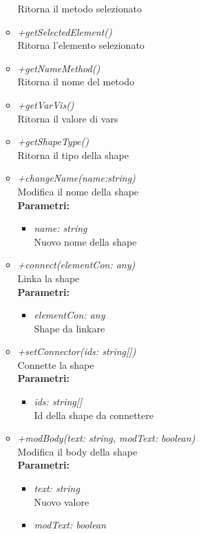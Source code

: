 \begin{itemize}
\begin{itemize}
    		Ritorna il metodo selezionato
    		\item \emph{+getSelectedElement()}\\
    		Ritorna l'elemento selezionato
    		\item \emph{+getNameMethod()}\\
    		Ritorna il nome del metodo
    		\item \emph{+getVarVis()}\\
    		Ritorna il valore di vars
    		\item \emph{+getShapeType()}\\
    		Ritorna il tipo della shape
    		\item \emph{+changeName(name:string)}\\
    		Modifica il nome della shape\\
    		\textbf{Parametri:}
    		\begin{itemize}
    			\item \emph{name: string}\\
    			Nuovo nome della shape
    		\end{itemize}
    		\item \emph{+connect(elementCon: any)}\\
    		Linka la shape\\
    		\textbf{Parametri:}
    		\begin{itemize}
    			\item \emph{elementCon: any}\\
    			Shape da linkare
    		\end{itemize}
    		\item \emph{+setConnector(ids: string[])}\\
    		Connette la shape\\
    		\textbf{Parametri:}
    		\begin{itemize}
    			\item \emph{ids: string[]}\\
    			Id della shape da connettere
    		\end{itemize}
    		\item \emph{+modBody(text: string, modText: boolean)}\\
    		Modifica il body della shape\\
    		\textbf{Parametri:}
    		\begin{itemize}
    			\item \emph{text: string}\\
    			Nuovo valore
    			\item \emph{modText: boolean}\\

\end{itemize}
\end{itemize}
\end{itemize}
